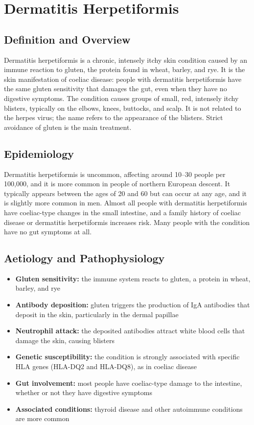 \chapter{Dermatitis Herpetiformis}

\section*{Definition and Overview}
Dermatitis herpetiformis is a chronic, intensely itchy skin condition caused by an immune reaction to gluten, the protein found in wheat, barley, and rye. It is the skin manifestation of coeliac disease: people with dermatitis herpetiformis have the same gluten sensitivity that damages the gut, even when they have no digestive symptoms. The condition causes groups of small, red, intensely itchy blisters, typically on the elbows, knees, buttocks, and scalp. It is not related to the herpes virus; the name refers to the appearance of the blisters. Strict avoidance of gluten is the main treatment.

\section*{Epidemiology}
Dermatitis herpetiformis is uncommon, affecting around 10--30 people per 100,000, and it is more common in people of northern European descent. It typically appears between the ages of 20 and 60 but can occur at any age, and it is slightly more common in men. Almost all people with dermatitis herpetiformis have coeliac-type changes in the small intestine, and a family history of coeliac disease or dermatitis herpetiformis increases risk. Many people with the condition have no gut symptoms at all.

\section*{Aetiology and Pathophysiology}
\begin{itemize}
    \item \textbf{Gluten sensitivity:} the immune system reacts to gluten, a protein in wheat, barley, and rye
    \item \textbf{Antibody deposition:} gluten triggers the production of IgA antibodies that deposit in the skin, particularly in the dermal papillae
    \item \textbf{Neutrophil attack:} the deposited antibodies attract white blood cells that damage the skin, causing blisters
    \item \textbf{Genetic susceptibility:} the condition is strongly associated with specific HLA genes (HLA-DQ2 and HLA-DQ8), as in coeliac disease
    \item \textbf{Gut involvement:} most people have coeliac-type damage to the intestine, whether or not they have digestive symptoms
    \item \textbf{Associated conditions:} thyroid disease and other autoimmune conditions are more common
\end{itemize}

